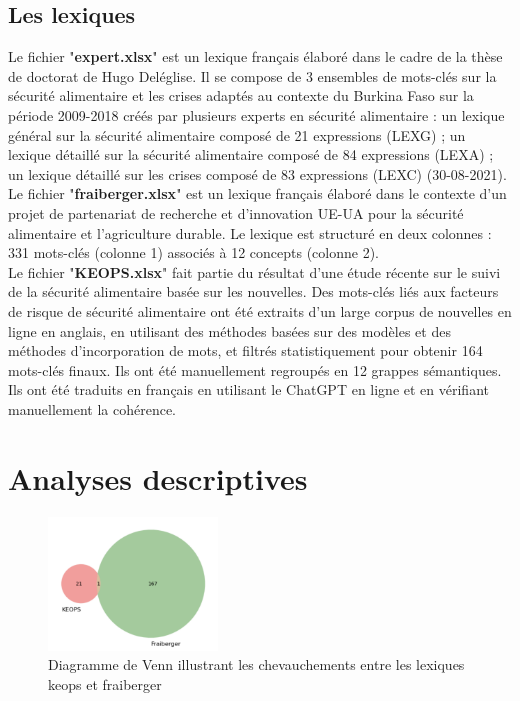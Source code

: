 \documentclass{article}
\begin{document}
\subsection{Les lexiques}
Le fichier "\textbf{expert.xlsx}" est un lexique français élaboré dans le cadre de la thèse de doctorat de Hugo Deléglise. Il se compose de 3 ensembles de mots-clés sur la sécurité alimentaire et les crises adaptés au contexte du Burkina Faso sur la période 2009-2018 créés par plusieurs experts en sécurité alimentaire : un lexique général sur la sécurité alimentaire composé de 21 expressions (LEXG) ; un lexique détaillé sur la sécurité alimentaire composé de 84 expressions (LEXA) ; un lexique détaillé sur les crises composé de 83 expressions (LEXC) (30-08-2021). \\

Le fichier "\textbf{fraiberger.xlsx}" est un lexique français élaboré dans le contexte d'un projet de partenariat de recherche et d'innovation UE-UA pour la sécurité alimentaire et l'agriculture durable. Le lexique est structuré en deux colonnes : 331 mots-clés (colonne 1) associés à 12 concepts (colonne 2). \\

Le fichier "\textbf{KEOPS.xlsx}" fait partie du résultat d'une étude récente sur le suivi de la sécurité alimentaire basée sur les nouvelles. Des mots-clés liés aux facteurs de risque de sécurité alimentaire ont été extraits d'un large corpus de nouvelles en ligne en anglais, en utilisant des méthodes basées sur des modèles et des méthodes d'incorporation de mots, et filtrés statistiquement pour obtenir 164 mots-clés finaux. Ils ont été manuellement regroupés en 12 grappes sémantiques. Ils ont été traduits en français en utilisant le ChatGPT en ligne et en vérifiant manuellement la cohérence.

\section{Analyses descriptives}
\begin{figure}[h]
    \centering
    \includegraphics[width=0.4\textwidth]{keops_fraiberger.png}
    \caption{Diagramme de Venn illustrant les chevauchements entre les lexiques keops et fraiberger }
    \label{fig:keops_fraiberger}
\end{figure}
\end{document}
